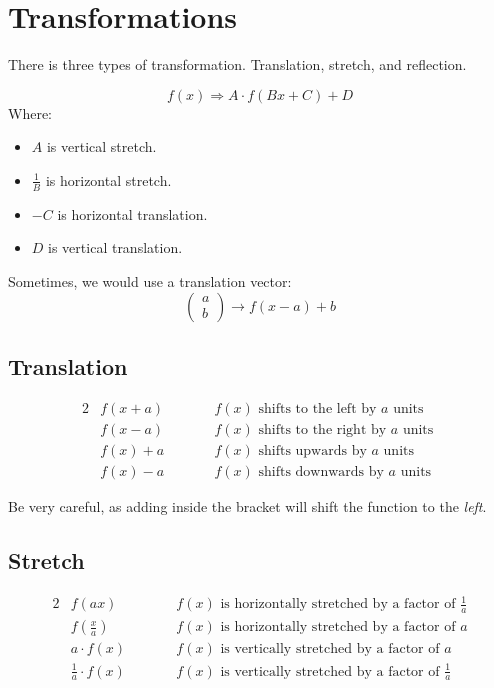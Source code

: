 \documentclass[../notes.tex]{subfiles}
\begin{document}
\section{Transformations}
There is three types of transformation. 
Translation, stretch, and reflection.

\begin{equation}
	f(x) \Rightarrow A \cdot f(Bx + C) + D
\end{equation} 
Where:
\begin{itemize}
	\item $A$ is vertical stretch.
	\item $\frac{1}{B}$ is horizontal stretch.
	\item $-C$ is horizontal translation.
	\item $D$ is vertical translation.
\end{itemize}

Sometimes, we would use a translation vector:
\begin{equation}
	\begin{pmatrix}
		a \\
		b
	\end{pmatrix} \rightarrow f(x-a)+b
\end{equation}

\subsection{Translation}
\begin{alignat}{2}
	&f(x+a) \qquad && f(x) \textrm{ shifts to the left by } a \textrm{ units } \\
	&f(x-a) \qquad && f(x) \textrm{ shifts to the right by } a \textrm{ units } \\
	&f(x)+a \qquad && f(x) \textrm{ shifts upwards by } a \textrm{ units } \\
	&f(x)-a \qquad && f(x) \textrm{ shifts downwards by } a \textrm{ units }
\end{alignat}

Be very careful, as adding inside the bracket will shift the function to the \textit{left}.

\subsection{Stretch}
\begin{alignat}{2}
	&f(ax) \qquad && f(x) \textrm{ is horizontally stretched by a factor of } \frac{1}{a} \\
	&f(\frac{x}{a}) \qquad && f(x) \textrm{ is horizontally stretched by a factor of } a \\
	&a \cdot f(x) \qquad && f(x) \textrm{ is vertically stretched by a factor of } a \\
	&\frac{1}{a} \cdot f(x) \qquad && f(x) \textrm{ is vertically stretched by a factor of } \frac{1}{a} \\
\end{alignat}
\end{document}

